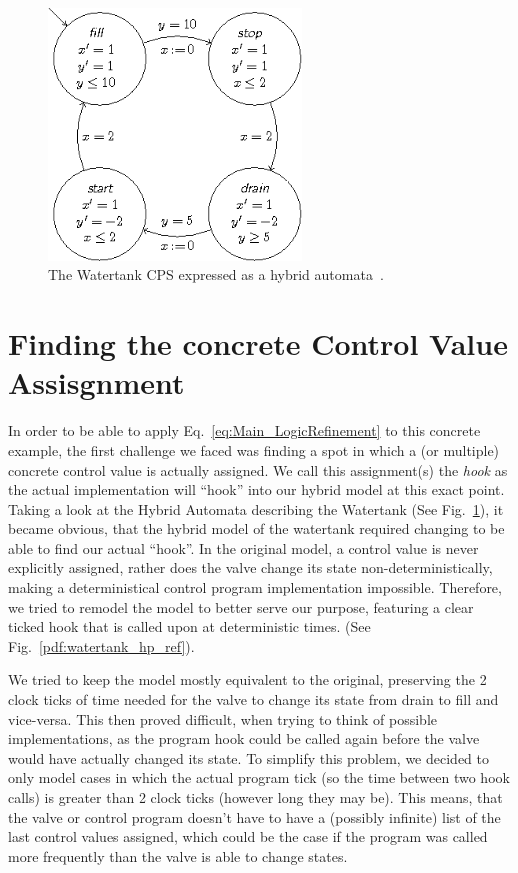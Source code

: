 \begin{figure}
	\centering
	\includegraphics[width=0.6\textwidth]{images/watertank_ha}
	\caption{The Watertank CPS expressed as a hybrid automata~\cite{keymaeraGuide}.}
	\label{fig:watertank_ha}
\end{figure}



\section{Finding the concrete Control Value Assisgnment}
\label{sec:Watertank:ControlValue}

In order to be able to apply Eq.~\ref{eq:Main_LogicRefinement} to this concrete example, the first challenge we faced was finding a spot in which a (or multiple) concrete control value is actually assigned. We call this assignment(s) the \textit{hook} as the actual implementation will ``hook'' into our hybrid model at this exact point. Taking a look at the Hybrid Automata describing the Watertank (See Fig.~\ref{fig:watertank_ha}), it became obvious, that the hybrid model of the watertank required changing to be able to find our actual ``hook''. In the original model, a control value is never explicitly assigned, rather does the valve change its state non-deterministically, making a deterministical control program implementation impossible. Therefore, we tried to remodel the model to better serve our purpose, featuring a clear ticked hook that is called upon at deterministic times. (See Fig.~\ref{pdf:watertank_hp_ref}).




We tried to keep the model mostly equivalent to the original, preserving the 2 clock ticks of time needed for the valve to change its state from drain to fill and vice-versa. This then proved difficult, when trying to think of possible implementations, as the program hook could be called again before the valve would have actually changed its state. To simplify this problem, we decided to only model cases in which the actual program tick (so the time between two hook calls)  is greater than 2 clock ticks (however long they may be).  This means, that the valve or control program doesn't have to have a (possibly infinite) list of the last control values assigned, which could be the case if the program was called more frequently than the valve is able to change states.

